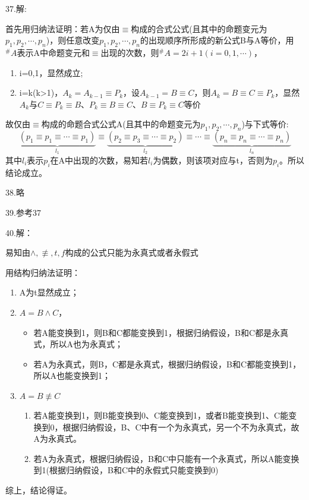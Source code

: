 \documentclass[a4paper]{ctexart}
\begin{document}
\noindent 37.解:

首先用归纳法证明：若A为仅由$\equiv$构成的合式公式(且其中的命题变元为$p_1,p_2,\cdots,p_n$)，则任意改变$p_1,p_2,\cdots,p_n$的出现顺序所形成的新公式B与A等价，用$^\#A$表示A中命题变元和$\equiv$出现的次数，则$^\#A=2i+1(i=0,1,\cdots)$，
\begin{enumerate}
    \item i=0,1，显然成立;
    \item i=k(k>1)，$A_k=A_{k-1}\equiv P_k$，设$A_{k-1}=B\equiv C$，则$A_k=B\equiv C\equiv P_k$，显然$A_k$与$C\equiv P_k \equiv B$、$P_k \equiv B \equiv C$、$B \equiv P_k  \equiv C$等价
\end{enumerate}
故仅由$\equiv$构成的命题合式公式A(且其中的命题变元为$p_1,p_2,\cdots,p_n$)与下式等价:
\begin{equation*}
    \underbrace{(p_1\equiv p_1\equiv \cdots\equiv p_1)}_{l_1}\equiv\underbrace{(p_2\equiv p_3\equiv \cdots\equiv p_2)}_{l_2}\equiv\cdots\equiv\underbrace{(p_n\equiv p_n\equiv \cdots\equiv p_n)}_{l_n}
    \end{equation*}
其中$l_i$表示$p_i$在A中出现的次数，易知若$l_i$为偶数，则该项对应与t，否则为$p_i$。所以结论成立。\newline
  
\noindent 38.略

\noindent 39.参考37

\noindent 40.解：

易知由$\wedge,\not\equiv,t,f$构成的公式只能为永真式或者永假式

用结构归纳法证明：
\begin{enumerate}
  \item A为t显然成立；
  \item $A=B\wedge C$，
  \begin{itemize}
    \item 若A能变换到1，则B和C都能变换到1，根据归纳假设，B和C都是永真式，所以A也为永真式；
    \item 若A为永真式，则B，C都是永真式，根据归纳假设，B和C都能变换到1，所以A也能变换到1；
  \end{itemize}    
  \item $A=B\not\equiv C$
  \begin{enumerate}
    \item 若A能变换到1，则B能变换到0、C能变换到1，或者B能变换到1、C能变换到0，根据归纳假设，B、C中有一个为永真式，另一个不为永真式，故A为永真式。
    \item 若A为永真式，根据归纳假设，B和C中只能有一个永真式，所以A能变换到1(根据归纳假设，B和C中的永假式只能变换到0)
  \end{enumerate}
  
\end{enumerate}
综上，结论得证。\newline
\end{document}
